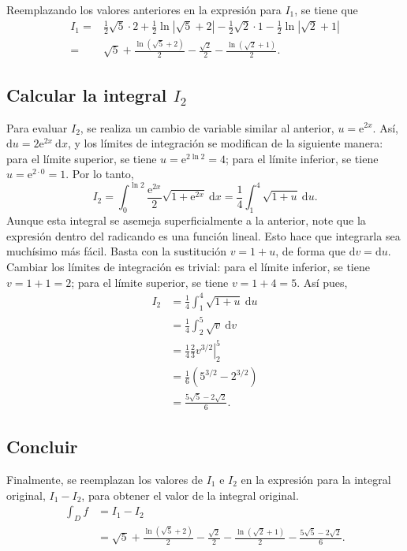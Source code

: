 \documentclass{fmbvecto}
\begin{document}
\begin{problema}
    Reemplazando los valores anteriores en la expresión para \(I_1\), se tiene que
    \begin{align*}
        I_1 =& \frac{1}{2} \sqrt{5} \cdot 2 + \frac{1}{2} \ln |\sqrt{5} + 2| - \frac{1}{2} \sqrt{2} \cdot 1 - \frac{1}{2} \ln |\sqrt{2} + 1| \\
        =& \sqrt{5} + \frac{\ln(\sqrt{5} + 2)}{2}  - \frac{\sqrt{2}}{2}  - \frac{\ln(\sqrt{2} + 1)}{2}.
    \end{align*}

    \subsection{Calcular la integral \(I_2\)}

    Para evaluar \(I_2\), se realiza un cambio de variable similar al anterior, \(u = \mathrm{e}^{2x}\). Así, \(\mathrm{d}u = 2 \mathrm{e}^{2x} \: \mathrm{d}x\), y los límites de integración se modifican de la siguiente manera: para el límite superior, se tiene \(u = \mathrm{e}^{2 \ln 2} = 4\); para el límite inferior, se tiene \(u = \mathrm{e}^{2 \cdot 0} = 1\). Por lo tanto,
    \[ I_2 = \int_{0}^{\ln 2} \frac{\mathrm{e}^{2x}}{2} \sqrt{1 + \mathrm{e}^{2x}} \: \mathrm{d}x = \frac{1}{4} \int_{1}^{4} \sqrt{1 + u} \: \mathrm{d}u. \]
    Aunque esta integral se asemeja superficialmente a la anterior, note que la expresión dentro del radicando es una función lineal. Esto hace que integrarla sea muchísimo más fácil. Basta con la sustitución \(v = 1 + u\), de forma que \(\mathrm{d}v = \mathrm{d}u\). Cambiar los límites de integración es trivial: para el límite inferior, se tiene \(v = 1 + 1 = 2\); para el límite superior, se tiene \(v = 1 + 4 = 5\). Así pues,
    \begin{align*}
        I_2 &= \frac{1}{4} \int_{1}^{4} \sqrt{1 + u} \: \mathrm{d}u \\
        &= \frac{1}{4} \int_{2}^{5} \sqrt{v} \: \mathrm{d}v \\
        &= \frac{1}{4} \left. \frac{2}{3} v^{3/2} \right\vert_{2}^{5} \\
        &= \frac{1}{6} \left( 5^{3/2} - 2^{3/2} \right) \\
        &= \frac{5 \sqrt{5} - 2 \sqrt{2}}{6}.
    \end{align*}

    \subsection{Concluir}

    Finalmente, se reemplazan los valores de \(I_1\) e \(I_2\) en la expresión para la integral original, \(I_1 - I_2\), para obtener el valor de la integral original.
    \begin{align*}
        \int_D f &= I_1 - I_2 \\
        &= \sqrt{5} + \frac{\ln(\sqrt{5} + 2)}{2}  - \frac{\sqrt{2}}{2}  - \frac{\ln(\sqrt{2} + 1)}{2} - \frac{5 \sqrt{5} - 2 \sqrt{2}}{6}.
    \end{align*}
\end{problema}
\end{document}
